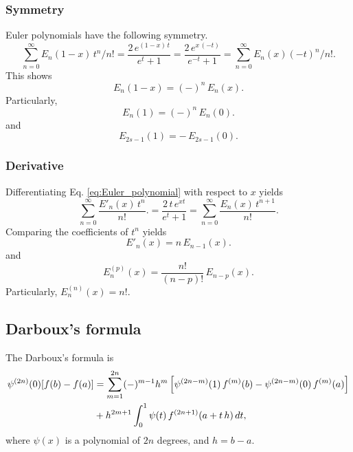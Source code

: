 \documentclass[aip,jcp,preprint,notitlepage, superscriptaddress]{revtex4-1}
\begin{document}
\subsubsection{Symmetry}



Euler polynomials have the following symmetry.
%
\begin{equation*}
\sum_{n = 0}^\infty
E_n(1 - x) \, t^n/n!
=
\frac{ 2 \, e^{(1 - x) \, t} }
{ e^t + 1 }
=
\frac{ 2 \, e^{ x \, (-t)} }
{ e^{-t} + 1 }
=
\sum_{n = 0}^\infty
E_n(x) (-t)^n / n!.
\end{equation*}
%
This shows
\[
E_n(1 - x) = (-)^n \, E_n(x).
\]
Particularly,
\[
E_n(1) = (-)^n \, E_n(0).
\]
and
\begin{equation}
E_{2s - 1}(1) = - \, E_{2s - 1}(0).
\label{eq:Euler1_odd}
\end{equation}



\subsubsection{Derivative}




Differentiating Eq. \eqref{eq:Euler_polynomial}
with respect to $x$ yields
\[
\sum_{n = 0}^\infty \frac{ E'_n(x) \, t^{n} } { n! }.
=
\frac{ 2 \, t \, e^{x t} }
{ e^t + 1 }
=
\sum_{n = 0}^\infty \frac{ E_n(x) \, t^{n + 1} } { n! }.
\]
Comparing the coefficients of $t^n$ yields
\[
E'_n(x)
=
n \, E_{n-1}(x).
\]
and
\begin{equation}
  E^{(p)}_n(x)
=
\frac{n!}{(n-p)!} \, E_{n-p}(x).
\label{eq:dEuler_polynomial}
\end{equation}
Particularly,
$E^{(n)}_n(x) = n!$.




\subsection{Darboux's formula}



The Darboux's formula\cite{
whittaker, wang_specfunc}
is
%
\begin{align}
\psi^{(2n)}(0) [f(b) - f(a)]
&=
\sum_{m = 1}^{2n}
  (-)^{m - 1} h^m
  \left[
    \psi^{(2n - m)}(1) \, f^{(m)}(b)
    -
    \psi^{(2n - m)}(0) \, f^{(m)}(a)
  \right]
\notag \\
&
+h^{2m + 1}
\int_0^1
  \psi(t) \, f^{(2n+1)}(a + t \, h) \, dt,
\label{eq:Darboux}
\end{align}
where
$\psi(x)$ is a polynomial of $2n$ degrees,
and $h = b - a$.
\end{document}

